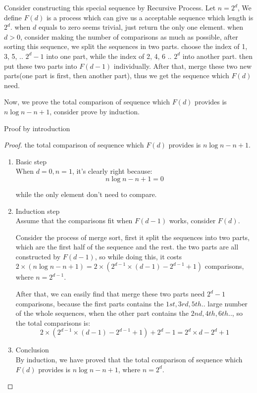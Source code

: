 Consider constructing this special sequence by Recursive Process. Let $n = 2^d$, We define $F(d)$ is a process which can give us a acceptable sequence which length is $2^d$. when $d$ equals to zero seems trivial, just return the only one element. when $d > 0$, consider making the number of comparisons as much as possible, after sorting this sequence, we split the sequences in two parts. choose the index of 1, 3, 5, .. $2^d-1$ into one part, while the index of 2, 4, 6 .. $2^d$ into another part. then put these two parts into $F(d - 1)$ individually. After that, merge these two new parts(one part is first, then another part), thus we get the sequence which $F(d)$ need.

Now, we prove the total comparison of sequence which $F(d)$ provides is $n\log n - n + 1$, consider prove by induction.

\item Proof by introduction
\begin{proof}
the total comparison of sequence which $F(d)$ provides is $n\log n - n + 1$.
\begin{enumerate}
    \item Basic step\\
    When $d = 0, n = 1$, it's clearly right because:
	\[n\log n - n + 1 = 0\]

    while the only element don't need to compare.
    \item Induction step\\
    Assume that the comparisons fit when $F(d - 1)$ works, consider $F(d)$.

    Consider the process of merge sort, first it split the sequences into two parts, which are the first half of the sequence and the rest. the two parts are all constructed by $F(d - 1)$, so while doing this, it costs $2 \times (n \log n - n + 1) = 2 \times (2 ^{d-1} \times (d - 1) - 2^{d - 1} + 1)$ comparisons, where $n = 2^{d - 1}$.

    After that, we can easily find that merge these two parts need $2^{d} - 1$ comparisons, because the first parts contains the $1st, 3rd, 5th ..$ large number of the whole sequences, when the other part contains the $2nd, 4th, 6th .. $, so the total comparisons is:
    \[2 \times (2^{d - 1} \times (d - 1) - 2^{d - 1} + 1) + 2^{d} - 1 = 2^{d} \times d - 2^{d} + 1\]

    \item Conclusion\\
	By induction, we have proved that the total comparison of sequence which $F(d)$ provides is $n\log n - n + 1$, where $n = 2^{d}$.
\end{enumerate}
\end{proof}

